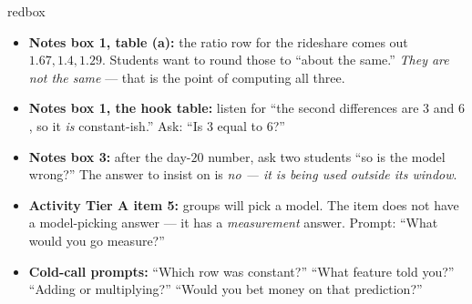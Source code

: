 \documentclass[10pt]{article}
\begin{document}
\begin{skillbox}{redbox}
\begin{itemize}[leftmargin=1.2em, itemsep=2pt, topsep=2pt]
  \item \textbf{Notes box 1, table (a):} the ratio row for the rideshare comes out $1.67, 1.4, 1.29$.
        Students want to round those to ``about the same.'' \emph{They are not the same} --- that is
        the point of computing all three.
  \item \textbf{Notes box 1, the hook table:} listen for ``the second differences are $3$ and $6$, so
        it \emph{is} constant-ish.'' Ask: ``Is $3$ equal to $6$?''
  \item \textbf{Notes box 3:} after the day-$20$ number, ask two students ``so is the model wrong?''
        The answer to insist on is \emph{no --- it is being used outside its window}.
  \item \textbf{Activity Tier A item 5:} groups will pick a model. The item does not have a
        model-picking answer --- it has a \emph{measurement} answer. Prompt: ``What would you go
        measure?''
  \item \textbf{Cold-call prompts:} ``Which row was constant?'' ``What feature told you?'' ``Adding
        or multiplying?'' ``Would you bet money on that prediction?''
\end{itemize}
\end{skillbox}
\end{document}
